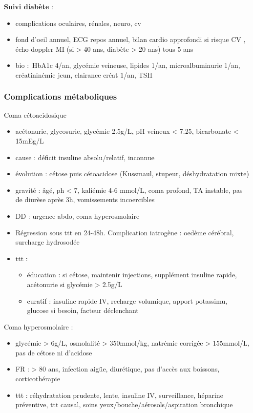 \documentclass[11pt]{article}
\begin{document}
\textbf{Suivi diabète} : 
\begin{itemize}
\item complications oculaires, rénales, neuro, cv
\item fond d'oeil annuel, ECG repos annuel, bilan cardio approfondi si risque CV
\inc, écho-doppler MI (si > 40 ans, diabète > 20 ans) tous 5 ans
\item bio : HbA1c 4/an, glycémie veineuse, lipides 1/an, microalbuminurie 1/an,
créatininémie jeun, clairance créat 1/an, TSH
\end{itemize}

\subsubsection{Complications métaboliques}
\label{sec:org374bde9}
Coma cétoacidosique
\begin{itemize}
\item acétonurie, glycosurie, glycémie 2.5g/L, pH veineux < 7.25, bicarbonate <
15mEg/L
\item cause : déficit insuline absolu/relatif, inconnue
\item évolution : cétose puis cétoacidose (Kussmaul, stupeur, déshydratation mixte)
\item gravité : âgé, ph < 7, kaliémie 4-6 mmol/L, coma profond, TA instable, pas de
diurèse après 3h, vomissements incoercibles
\item DD : urgence abdo, coma hyperosmolaire
\item Régression sous ttt en 24-48h. Complication iatrogène : oedème cérébral,
surcharge hydrosodée
\item ttt :
\begin{itemize}
\item éducation : si cétose, maintenir injections, supplément insuline rapide,
acétonurie si glycémie > 2.5g/L
\item curatif : insuline rapide IV, recharge volumique, apport potassimu, glucose
si besoin, facteur déclenchant
\end{itemize}
\end{itemize}

Coma hyperosmolaire :
\begin{itemize}
\item glycémie > 6g/L, osmolalité > 350mmol/kg, natrémie corrigée > 155mmol/L, pas
de cétose ni d'acidose
\item FR : > 80 ans, infection aigüe, diurétique, pas d'accès aux boissons, corticothérapie
\item ttt : réhydratation prudente, lente, insuline IV, surveillance, héparine
préventive, ttt causal, soins yeux/bouche/aérosols/aspiration bronchique
\end{itemize}
\end{document}

